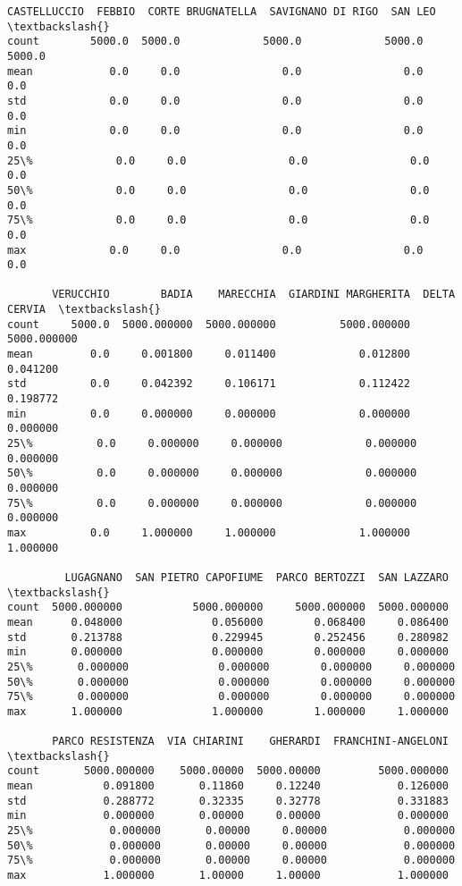 \documentclass[11pt]{article}
\makeatletter
\newcommand{\boxspacing}{\kern\kvtcb@left@rule\kern\kvtcb@boxsep}
\newcommand{\prompt}[4]{
        {\ttfamily\llap{{\color{#2}[#3]:\hspace{3pt}#4}}\vspace{-\baselineskip}}
    }
\makeatother
\begin{document}
            \begin{tcolorbox}[breakable, size=fbox, boxrule=.5pt, pad at break*=1mm, opacityfill=0]
\prompt{Out}{outcolor}{25}{\boxspacing}
\begin{Verbatim}[commandchars=\\\{\}]
       CASTELLUCCIO  FEBBIO  CORTE BRUGNATELLA  SAVIGNANO DI RIGO  SAN LEO  \textbackslash{}
count        5000.0  5000.0             5000.0             5000.0   5000.0
mean            0.0     0.0                0.0                0.0      0.0
std             0.0     0.0                0.0                0.0      0.0
min             0.0     0.0                0.0                0.0      0.0
25\%             0.0     0.0                0.0                0.0      0.0
50\%             0.0     0.0                0.0                0.0      0.0
75\%             0.0     0.0                0.0                0.0      0.0
max             0.0     0.0                0.0                0.0      0.0

       VERUCCHIO        BADIA    MARECCHIA  GIARDINI MARGHERITA  DELTA CERVIA  \textbackslash{}
count     5000.0  5000.000000  5000.000000          5000.000000   5000.000000
mean         0.0     0.001800     0.011400             0.012800      0.041200
std          0.0     0.042392     0.106171             0.112422      0.198772
min          0.0     0.000000     0.000000             0.000000      0.000000
25\%          0.0     0.000000     0.000000             0.000000      0.000000
50\%          0.0     0.000000     0.000000             0.000000      0.000000
75\%          0.0     0.000000     0.000000             0.000000      0.000000
max          0.0     1.000000     1.000000             1.000000      1.000000

         LUGAGNANO  SAN PIETRO CAPOFIUME  PARCO BERTOZZI  SAN LAZZARO  \textbackslash{}
count  5000.000000           5000.000000     5000.000000  5000.000000
mean      0.048000              0.056000        0.068400     0.086400
std       0.213788              0.229945        0.252456     0.280982
min       0.000000              0.000000        0.000000     0.000000
25\%       0.000000              0.000000        0.000000     0.000000
50\%       0.000000              0.000000        0.000000     0.000000
75\%       0.000000              0.000000        0.000000     0.000000
max       1.000000              1.000000        1.000000     1.000000

       PARCO RESISTENZA  VIA CHIARINI    GHERARDI  FRANCHINI-ANGELONI  \textbackslash{}
count       5000.000000    5000.00000  5000.00000         5000.000000
mean           0.091800       0.11860     0.12240            0.126000
std            0.288772       0.32335     0.32778            0.331883
min            0.000000       0.00000     0.00000            0.000000
25\%            0.000000       0.00000     0.00000            0.000000
50\%            0.000000       0.00000     0.00000            0.000000
75\%            0.000000       0.00000     0.00000            0.000000
max            1.000000       1.00000     1.00000            1.000000


\end{Verbatim}
\end{tcolorbox}
\end{document}

